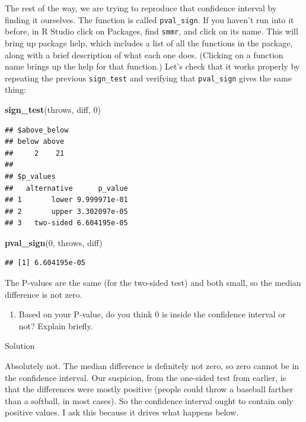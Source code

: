 \documentclass[]{tufte-book}
\newenvironment{Shaded}{}{}
\newcommand{\DecValTok}[1]{\textcolor[rgb]{0.25,0.63,0.44}{#1}}
\newcommand{\KeywordTok}[1]{\textcolor[rgb]{0.00,0.44,0.13}{\textbf{#1}}}
\newcommand{\NormalTok}[1]{#1}
\providecommand{\tightlist}{%
  \setlength{\itemsep}{0pt}\setlength{\parskip}{0pt}}
\theoremstyle{definition}
\theoremstyle{definition}
\theoremstyle{definition}
\theoremstyle{remark}
\begin{document}
The rest of the way, we are trying to reproduce that confidence interval
by finding it ourselves. The function is called \texttt{pval\_sign}. If
you haven't run into it before, in R Studio click on Packages, find
\texttt{smmr}, and click on its name. This will bring up package help,
which includes a list of all the functions in the package, along with a
brief description of what each one does. (Clicking on a function name
brings up the help for that function.) Let's check that it works
properly by repeating the previous \texttt{sign\_test} and verifying
that \texttt{pval\_sign} gives the same thing:

\begin{Shaded}
\begin{Highlighting}[]
\KeywordTok{sign_test}\NormalTok{(throws, diff, }\DecValTok{0}\NormalTok{)}
\end{Highlighting}
\end{Shaded}

\begin{verbatim}
## $above_below
## below above 
##     2    21 
## 
## $p_values
##   alternative      p_value
## 1       lower 9.999971e-01
## 2       upper 3.302097e-05
## 3   two-sided 6.604195e-05
\end{verbatim}

\begin{Shaded}
\begin{Highlighting}[]
\KeywordTok{pval_sign}\NormalTok{(}\DecValTok{0}\NormalTok{, throws, diff)}
\end{Highlighting}
\end{Shaded}

\begin{verbatim}
## [1] 6.604195e-05
\end{verbatim}

The P-values are the same (for the two-sided test) and both small, so
the median difference is not zero.

\begin{enumerate}
\def\labelenumi{(\alph{enumi})}
\setcounter{enumi}{3}
\tightlist
\item
  Based on your P-value, do you think 0 is inside the confidence
  interval or not? Explain briefly.
\end{enumerate}

Solution

Absolutely not. The median difference is definitely not zero, so zero
cannot be in the confidence interval. Our suspicion, from the one-sided
test from earlier, is that the differences were mostly positive (people
could throw a baseball farther than a softball, in most cases). So the
confidence interval ought to contain only positive values. I ask this
because it drives what happens below.
\end{document}
